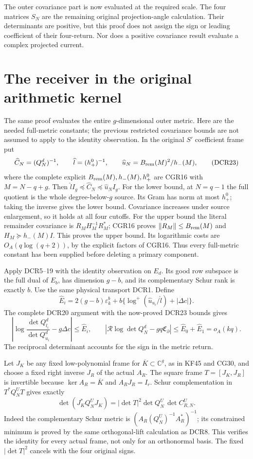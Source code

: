 \documentclass[11pt]{article}
\newcommand{\C}{\mathbb C}\newcommand{\Pp}{\mathcal P}
\newcommand{\lp}{\log^+}
\begin{document}
The outer covariance part is now evaluated at the required scale.
The four matrices \(S_N\) are the remaining original projection-angle
calculation. Their determinants are positive, but this proof does
not assign the sign or leading coefficient of their four-return.
Nor does a positive covariance result evaluate a complex projected
current.

\section{The receiver in the original arithmetic kernel}

The same proof evaluates the entire \(g\)-dimensional outer metric.
Here are the needed full-metric constants; the previous restricted
covariance bounds are not assumed to apply to the identity observation.
In the original \(S'\) coefficient frame put
\[
\widehat C_N=(Q_N^d)^{-1},\qquad
\widehat l=(h_+^0)^{-1},\qquad
\widehat u_N=B_{\rm rem}(M)^2/h_-(M),
\tag{DCR23}
\]
where the complete explicit \(B_{\rm rem}(M),h_-(M),h_+^0\)
are CGR16 with \(M=N-q+g\). Then
\(\widehat l I_g\preceq\widehat C_N
\preceq\widehat u_N I_g\).
For the lower bound, at \(N=q-1\) the full quotient is the whole
degree-below-\(g\) source. Its Gram has norm at most \(h_+^0\);
taking the inverse gives the lower bound. Covariance increases
under source enlargement, so it holds at all four cutoffs.
For the upper bound the literal remainder covariance is
\(R_MH_M^{-1}R_M^*\); CGR16 proves
\(\|R_M\|\le B_{\rm rem}(M)\) and \(H_M\succeq h_-(M)I\).
This proves the upper bound. Its logarithmic costs are
\(O_A(q\log(q+2))\), by the explicit factors of CGR16.
Thus every full-metric constant has been supplied before deleting
a primary component.

Apply DCR5--19 with the identity observation on \(E_d\).
Its good row subspace is the full dual of \(E_b\), has dimension
\(g-b\), and its complementary Schur rank is exactly \(b\).
Use the same physical transport DCR1. Define
\[
\widehat E_i=
 2(g-b)\varepsilon_k^b+
 b\{\lp(\widehat u_{u_i}/\widehat l)+|\Delta c|\}.
\]
The complete DCR20 argument with the now-proved DCR23 bounds gives
\[
\left|\log\frac{\det Q_{l_i}^d}{\det Q_{u_i}^d}
                         -g\Delta c\right|\le\widehat E_i,
\qquad
\left|\mathcal R\log\det Q_N^d-gq\mathfrak C_\partial\right|
 \le\widehat E_0+\widehat E_1=o_A(kq).
\tag{DCR24}
\]
The reciprocal determinant accounts for the sign in the metric return.

Let \(J_K\) be any fixed low-polynomial frame for
\(\overline K\subset\C^g\), as in KF45 and CG30, and choose a
fixed right inverse \(J_R\) of the actual \(A_R\).
The square frame \(T=[J_K,J_R]\) is invertible because
\(\ker A_R=\overline K\) and \(A_RJ_R=I_r\).
Schur complementation in \(T^*Q_N^UT\) gives exactly
\[
 \det(J_K^*Q_N^UJ_K)
   =|\det T|^2\det Q_N^U\,\det C_{R,N}^U .
\tag{DCR25}
\]
Indeed the complementary Schur metric is
\((A_R(Q_N^U)^{-1}A_R^*)^{-1}\); its constrained minimum is
proved by the same orthogonal-lift calculation as DCR8.
This verifies the identity for every actual frame, not only for
an orthonormal basis. The fixed \(|\det T|^2\) cancels with the
four original signs.
\end{document}
